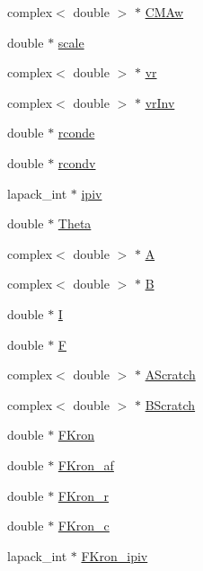 \begin{DoxyCompactItemize}
\item 
complex$<$ double $>$ $\ast$ \hyperlink{class_c_a_r_m_a_a796f3af91b03b11b3d08f3ce668de258}{C\-M\-Aw}
\item 
double $\ast$ \hyperlink{class_c_a_r_m_a_ada896ef5d67dad63fb8671be1889b42a}{scale}
\item 
complex$<$ double $>$ $\ast$ \hyperlink{class_c_a_r_m_a_a7ef9e8afd4bd3adcf2931bad09c831af}{vr}
\item 
complex$<$ double $>$ $\ast$ \hyperlink{class_c_a_r_m_a_a1128984d1bb62a18c9046730fdc9b234}{vr\-Inv}
\item 
double $\ast$ \hyperlink{class_c_a_r_m_a_abd47e4fb92d1a455aa1702a2242825d0}{rconde}
\item 
double $\ast$ \hyperlink{class_c_a_r_m_a_a6573aee6903bc05dd601c3355905f68d}{rcondv}
\item 
lapack\-\_\-int $\ast$ \hyperlink{class_c_a_r_m_a_ad000fbedcf5b10d37212f43c23e65431}{ipiv}
\item 
double $\ast$ \hyperlink{class_c_a_r_m_a_a5717e11c4a42a0d3c932a69e6493d22b}{Theta}
\item 
complex$<$ double $>$ $\ast$ \hyperlink{class_c_a_r_m_a_af80126208923015a2149c11314bbc798}{A}
\item 
complex$<$ double $>$ $\ast$ \hyperlink{class_c_a_r_m_a_ae95636dd50674cb98dc309ce7042f2ed}{B}
\item 
double $\ast$ \hyperlink{class_c_a_r_m_a_ab07ac5e7150cb4674150f4c27ce4afd7}{I}
\item 
double $\ast$ \hyperlink{class_c_a_r_m_a_aad97cb3334f43c80bfb2aabb1b22bb52}{F}
\item 
complex$<$ double $>$ $\ast$ \hyperlink{class_c_a_r_m_a_a5ccd955a53c7473f750a8d03934d49cc}{A\-Scratch}
\item 
complex$<$ double $>$ $\ast$ \hyperlink{class_c_a_r_m_a_a1086542a2badf2a6d6cab3f4dc3825fd}{B\-Scratch}
\item 
double $\ast$ \hyperlink{class_c_a_r_m_a_a45b3f6243c0ebd0dbe4b3b2b6c41dc42}{F\-Kron}
\item 
double $\ast$ \hyperlink{class_c_a_r_m_a_afb5265a4a649bda74d75346703633bd5}{F\-Kron\-\_\-af}
\item 
double $\ast$ \hyperlink{class_c_a_r_m_a_a8767db54a4a42729310a11e1fefc8fba}{F\-Kron\-\_\-r}
\item 
double $\ast$ \hyperlink{class_c_a_r_m_a_ae051792220350a8ca5bf9619d97351ac}{F\-Kron\-\_\-c}
\item 
lapack\-\_\-int $\ast$ \hyperlink{class_c_a_r_m_a_afaf0d0b033ee891862d59a7800d9cdaf}{F\-Kron\-\_\-ipiv}

\end{DoxyCompactItemize}
